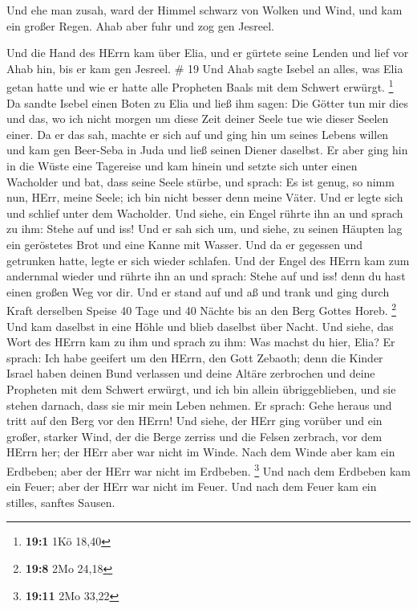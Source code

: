  Und ehe man zusah, ward der Himmel schwarz von Wolken und
Wind, und kam ein großer Regen. Ahab aber fuhr und zog gen Jesreel.

 Und die Hand des HErrn kam über Elia, und er gürtete seine
Lenden und lief vor Ahab hin, bis er kam gen Jesreel. \# 19 
Und Ahab sagte Isebel an alles, was Elia getan hatte und wie er hatte
alle Propheten Baals mit dem Schwert erwürgt. \footnote{\textbf{19:1}
  1Kö 18,40}  Da sandte Isebel einen Boten zu Elia und ließ
ihm sagen: Die Götter tun mir dies und das, wo ich nicht morgen um diese
Zeit deiner Seele tue wie dieser Seelen einer.  Da er das
sah, machte er sich auf und ging hin um seines Lebens willen und kam gen
Beer-Seba in Juda und ließ seinen Diener daselbst.  Er aber
ging hin in die Wüste eine Tagereise und kam hinein und setzte sich
unter einen Wacholder und bat, dass seine Seele stürbe, und sprach: Es
ist genug, so nimm nun, HErr, meine Seele; ich bin nicht besser denn
meine Väter.  Und er legte sich und schlief unter dem
Wacholder. Und siehe, ein Engel rührte ihn an und sprach zu ihm: Stehe
auf und iss!  Und er sah sich um, und siehe, zu seinen
Häupten lag ein geröstetes Brot und eine Kanne mit Wasser. Und da er
gegessen und getrunken hatte, legte er sich wieder schlafen.
 Und der Engel des HErrn kam zum andernmal wieder und rührte
ihn an und sprach: Stehe auf und iss! denn du hast einen großen Weg vor
dir.  Und er stand auf und aß und trank und ging durch Kraft
derselben Speise 40 Tage und 40 Nächte bis an den Berg Gottes Horeb.
\footnote{\textbf{19:8} 2Mo 24,18}  Und kam daselbst in eine
Höhle und blieb daselbst über Nacht. Und siehe, das Wort des HErrn kam
zu ihm und sprach zu ihm: Was machst du hier, Elia?  Er
sprach: Ich habe geeifert um den HErrn, den Gott Zebaoth; denn die
Kinder Israel haben deinen Bund verlassen und deine Altäre zerbrochen
und deine Propheten mit dem Schwert erwürgt, und ich bin allein
übriggeblieben, und sie stehen darnach, dass sie mir mein Leben nehmen.
 Er sprach: Gehe heraus und tritt auf den Berg vor den
HErrn! Und siehe, der HErr ging vorüber und ein großer, starker Wind,
der die Berge zerriss und die Felsen zerbrach, vor dem HErrn her; der
HErr aber war nicht im Winde. Nach dem Winde aber kam ein Erdbeben; aber
der HErr war nicht im Erdbeben. \footnote{\textbf{19:11} 2Mo 33,22}
 Und nach dem Erdbeben kam ein Feuer; aber der HErr war
nicht im Feuer. Und nach dem Feuer kam ein stilles, sanftes Sausen.
